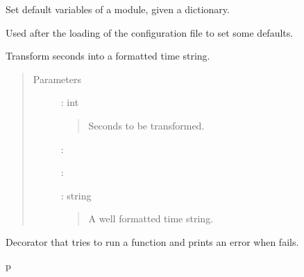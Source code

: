 \documentclass[letterpaper,10pt,english]{sphinxmanual}
\begin{document}

\begin{fulllineitems}
\label{\detokenize{api:palladio.utils.set_module_defaults}}
Set default variables of a module, given a dictionary.

Used after the loading of the configuration file to set some defaults.

\end{fulllineitems}


\begin{fulllineitems}
\label{\detokenize{api:palladio.utils.sec_to_timestring}}
Transform seconds into a formatted time string.
\begin{quote}\begin{description}
\item[{Parameters}] \leavevmode
{} : int
\begin{quote}

Seconds to be transformed.
\end{quote}

 :

\sphinxstylestrong{-----------} :

 : string
\begin{quote}

A well formatted time string.
\end{quote}

\end{description}\end{quote}

\end{fulllineitems}


\begin{fulllineitems}
\label{\detokenize{api:palladio.utils.safe_run}}
Decorator that tries to run a function and prints an error when fails.

\end{fulllineitems}



\renewcommand{\indexname}{Python Module Index}
\begin{sphinxtheindex}
\def\bigletter#1{{\Large\sffamily#1}\nopagebreak\vspace{1mm}}
\bigletter{p}
\item {}
\item {}
\end{sphinxtheindex}

\renewcommand{\indexname}{Index}
\printindex
\end{document}
